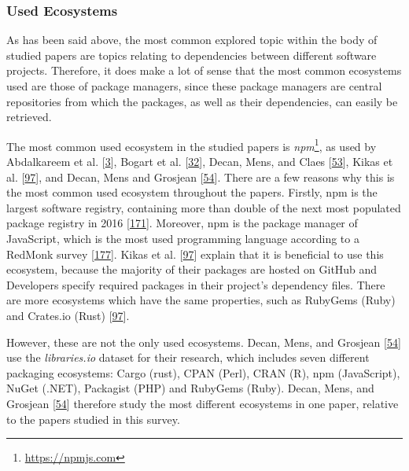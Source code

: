 \documentclass[]{book}
\let\rmarkdownfootnote\footnote%
\def\footnote{\protect\rmarkdownfootnote}
\begin{document}
\subsubsection{Used Ecosystems}\label{used-ecosystems}

As has been said above, the most common explored topic within the body
of studied papers are topics relating to dependencies between different
software projects. Therefore, it does make a lot of sense that the most
common ecosystems used are those of package managers, since these
package managers are central repositories from which the packages, as
well as their dependencies, can easily be retrieved.

The most common used ecosystem in the studied papers is
\emph{npm}\footnote{\url{https://npmjs.com}}, as used by Abdalkareem et
al. {[}\protect\hyperlink{ref-Abdalkareem2017}{3}{]}, Bogart et al.
{[}\protect\hyperlink{ref-Bogart2016}{32}{]}, Decan, Mens, and Claes
{[}\protect\hyperlink{ref-Decan2017}{53}{]}, Kikas et al.
{[}\protect\hyperlink{ref-Kikas2017}{97}{]}, and Decan, Mens and
Grosjean {[}\protect\hyperlink{ref-Decan2018}{54}{]}. There are a few
reasons why this is the most common used ecosystem throughout the
papers. Firstly, npm is the largest software registry, containing more
than double of the next most populated package registry in 2016
{[}\protect\hyperlink{ref-Linux2016}{171}{]}. Moreover, npm is the
package manager of JavaScript, which is the most used programming
language according to a RedMonk survey
{[}\protect\hyperlink{ref-RedMonk2018}{177}{]}. Kikas et al.
{[}\protect\hyperlink{ref-Kikas2017}{97}{]} explain that it is
beneficial to use this ecosystem, because the majority of their packages
are hosted on GitHub and Developers specify required packages in their
project's dependency files. There are more ecosystems which have the
same properties, such as RubyGems (Ruby) and Crates.io (Rust)
{[}\protect\hyperlink{ref-Kikas2017}{97}{]}.

However, these are not the only used ecosystems. Decan, Mens, and
Grosjean {[}\protect\hyperlink{ref-Decan2018}{54}{]} use the
\emph{libraries.io} dataset for their research, which includes seven
different packaging ecosystems: Cargo (rust), CPAN (Perl), CRAN (R), npm
(JavaScript), NuGet (.NET), Packagist (PHP) and RubyGems (Ruby). Decan,
Mens, and Grosjean {[}\protect\hyperlink{ref-Decan2018}{54}{]} therefore
study the most different ecosystems in one paper, relative to the papers
studied in this survey.
\end{document}
